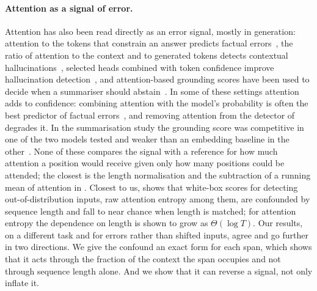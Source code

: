 \documentclass[11pt,a4paper]{article}
\begin{document}
\paragraph{Attention as a signal of error.} Attention has also been read directly as an error signal, mostly in generation:
attention to the tokens that constrain an answer predicts factual errors~\citep{yuksekgonul2023attention}, the ratio of
attention to the context and to generated tokens detects contextual hallucinations~\citep{chuang2024lookback}, selected heads
combined with token confidence improve hallucination detection~\citep{vazhentsev2025rauq}, and attention-based grounding
scores have been used to decide when a summariser should abstain~\citep{yan2026abstention}. In some of these
settings attention adds to confidence: combining attention with the model's probability is often the best predictor of
factual errors~\citep{yuksekgonul2023attention}, and removing attention from the detector of \citet{vazhentsev2025rauq}
degrades it. In the summarisation study the grounding score was competitive in one of the two models tested and weaker than
an embedding baseline in the other~\citep{yan2026abstention}. None of these compares the signal with a reference for how
much attention a position would receive given only how many positions could be attended; the closest is the length
normalisation and the subtraction of a running mean of attention in \citet{vazhentsev2025rauq}. Closest to us,
\citet{saghir2026twopathway} shows that white-box scores for detecting out-of-distribution inputs, raw attention entropy among
them, are confounded by sequence length and fall to near chance when length is matched; for attention entropy the dependence on
length is shown to grow as $\Theta(\log T)$. Our results, on a different task and
for errors rather than shifted inputs, agree and go further in two directions. We give the confound an exact form for each
span, which shows that it acts through the fraction of the context the span occupies and not through sequence length alone.
And we show that it can reverse a signal, not only inflate it.
\end{document}
